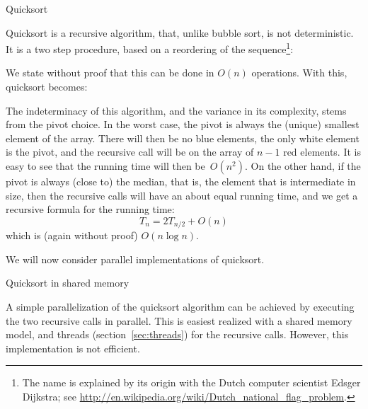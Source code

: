 
 {Quicksort}
\label{sec:quicksort}

Quicksort is a recursive algorithm, that, unlike bubble sort, is not
deterministic. It is a two step procedure, based on a reordering of
the sequence\footnote{The name is explained by its origin with the
  Dutch computer scientist Edsger Dijkstra; see
  \url{http://en.wikipedia.org/wiki/Dutch_national_flag_problem}.}:

\begin{displayalgorithm}
\end{displayalgorithm}

We state without proof that this can be done in $O(n)$ operations.
With this, quicksort becomes:

\begin{displayalgorithm}
\end{displayalgorithm}

The indeterminacy of this algorithm, and the variance in its
complexity, stems from the pivot choice. In the worst case, the pivot
is always the (unique) smallest element of the array. There will then
be no blue elements, the only white element is the pivot, and the
recursive call will be on the array of $n-1$ red elements. It is easy
to see that the running time will then be~$O(n^2)$. On the other hand,
if the pivot is always (close to) the median, that is, the element
that is intermediate in size, then the recursive calls will have an
about equal running time, and we get a recursive formula for the
running time:
\[ T_n = 2T_{n/2} + O(n) \]
which  is (again without proof) $O(n\log n)$.

We will now consider parallel implementations of quicksort.

 {Quicksort in shared memory}

A simple parallelization of the quicksort algorithm can be achieved by
executing the two recursive calls in parallel. This is easiest
realized with a shared memory model, and threads
(section~\ref{sec:threads}) for the recursive calls. However, this
implementation is not efficient. 

